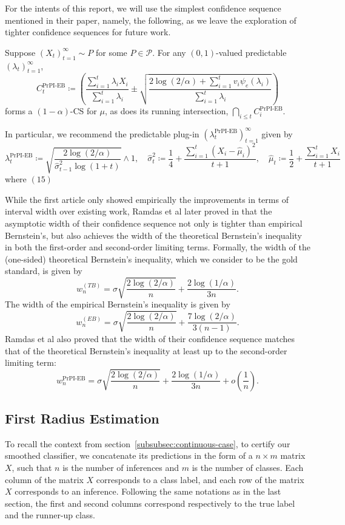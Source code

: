For the intents of this report, we will use the simplest confidence sequence mentioned in their paper, namely, the following, as we leave the exploration of tighter confidence sequences for future work.
\begin{proposition}\label{prop:confidence-sequence}
    Suppose $(X_t)_{t=1}^\infty \sim P$ for some $P \in \mathcal{P}$. For any $(0,1)$-valued predictable $(\lambda_t)_{t=1}^\infty$,
    \[
        C_t^{\text{PrPI-EB}} \coloneqq \left( \frac{\sum_{i=1}^t \lambda_i X_i}{\sum_{i=1}^t \lambda_i}\pm \sqrt{\frac{2\log(2/\alpha) + \sum_{i=1}^t v_i \psi_e (\lambda_i)}{\sum_{i=1}^t \lambda_i}} \right)
    \]
    forms a $(1-\alpha)$-CS for $\mu$, as does its running intersection, $\bigcap_{i \leq t} C_i^{\text{PrPI-EB}}$.

    In particular, we recommend the predictable plug-in $(\lambda_t^{\text{PrPI-EB}})_{t=1}^\infty$ given by
    \[
        \lambda_t^{\text{PrPI-EB}} \coloneqq \sqrt{\frac{2\log(2/\alpha)}{\hat{\sigma}_{t-1}^2 \log(1 + t)}} \wedge 1, \quad \hat{\sigma}_t^2 \coloneqq \frac{1}{4} + \frac{\sum_{i=1}^t (X_i - \hat{\mu}_i)^2}{t + 1}, \quad \hat{\mu}_t \coloneqq \frac{1}{2} + \frac{\sum_{i=1}^t X_i}{t + 1}
    \]
    where $(15)$
\end{proposition}

While the first article only showed empirically the improvements in terms of interval width over existing work, Ramdas et al later proved in that the asymptotic width of their confidence sequence not only is tighter than empirical Bernstein's, but also achieves the width of the theoretical Bernstein's inequality in both the first-order and second-order limiting terms.
Formally, the width of the (one-sided) theoretical Bernstein's inequality, which we consider to be the gold standard, is given by
\[
    w_n^{(TB)} = \sigma \sqrt{\frac{2\log(2/\alpha)}{n}} + \frac{2\log(1/\alpha)}{3n}.
\]
The width of the empirical Bernstein's inequality is given by
\[
    w_n^{(EB)} = \sigma \sqrt{\frac{2\log(2/\alpha)}{n}} + \frac{7\log(2/\alpha)}{3(n-1)}.
\]
Ramdas et al also proved that the width of their confidence sequence matches that of the theoretical Bernstein's inequality at least up to the second-order limiting term:
\[
    w_n^{\text{PrPI-EB}} = \sigma \sqrt{\frac{2\log(2/\alpha)}{n}} + \frac{2\log(1/\alpha)}{3n}+{o}\left( \frac{1}{n} \right).
\]

\subsection{First Radius Estimation}\label{subsec:first-radius-estimation-continuous}
To recall the context from section~\ref{subsubsec:continuous-case}, to certify our smoothed classifier, we concatenate its predictions in the form of a $n \times m$ matrix $X$, such that $n$ is the number of inferences and $m$ is the number of classes.
Each column of the matrix $X$ corresponds to a class label, and each row of the matrix $X$ corresponds to an inference.
Following the same notations as in the last section, the first and second columns correspond respectively to the true label and the runner-up class.

